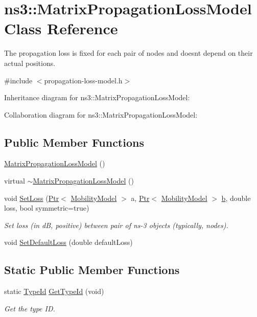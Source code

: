 \hypertarget{classns3_1_1MatrixPropagationLossModel}{}\section{ns3\+:\+:Matrix\+Propagation\+Loss\+Model Class Reference}
\label{classns3_1_1MatrixPropagationLossModel}


The propagation loss is fixed for each pair of nodes and doesn\textquotesingle{}t depend on their actual positions.  




{\ttfamily \#include $<$propagation-\/loss-\/model.\+h$>$}



Inheritance diagram for ns3\+:\+:Matrix\+Propagation\+Loss\+Model\+:


Collaboration diagram for ns3\+:\+:Matrix\+Propagation\+Loss\+Model\+:
\subsection*{Public Member Functions}
\begin{DoxyCompactItemize}
\item 
\hyperlink{classns3_1_1MatrixPropagationLossModel_a2cbed41133d1ad59e58767a8515e0306}{Matrix\+Propagation\+Loss\+Model} ()
\item 
virtual \hyperlink{classns3_1_1MatrixPropagationLossModel_a9586b4c40acdd42dad7d5734ec73529c}{$\sim$\+Matrix\+Propagation\+Loss\+Model} ()
\item 
void \hyperlink{classns3_1_1MatrixPropagationLossModel_a16fd1f9be7b7246423818632d710947d}{Set\+Loss} (\hyperlink{classns3_1_1Ptr}{Ptr}$<$ \hyperlink{classns3_1_1MobilityModel}{Mobility\+Model} $>$ a, \hyperlink{classns3_1_1Ptr}{Ptr}$<$ \hyperlink{classns3_1_1MobilityModel}{Mobility\+Model} $>$ \hyperlink{lte__pathloss_8m_a21ad0bd836b90d08f4cf640b4c298e7c}{b}, double loss, bool symmetric=true)
\begin{DoxyCompactList}\small\item\em Set loss (in dB, positive) between pair of ns-\/3 objects (typically, nodes). \end{DoxyCompactList}\item 
void \hyperlink{classns3_1_1MatrixPropagationLossModel_a18c185657dd9025daf37558d16b6cee9}{Set\+Default\+Loss} (double default\+Loss)
\end{DoxyCompactItemize}
\subsection*{Static Public Member Functions}
\begin{DoxyCompactItemize}
\item 
static \hyperlink{classns3_1_1TypeId}{Type\+Id} \hyperlink{classns3_1_1MatrixPropagationLossModel_a732a98200adf70c0202486bf5e9753b0}{Get\+Type\+Id} (void)
\begin{DoxyCompactList}\small\item\em Get the type ID. \end{DoxyCompactList}\end{DoxyCompactItemize}
